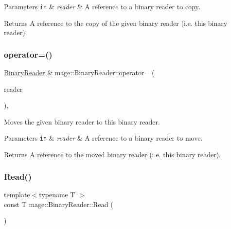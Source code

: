 \begin{DoxyParams}[1]{Parameters}
\mbox{\tt in}  & {\em reader} & A reference to a binary reader to copy. \\
\hline
\end{DoxyParams}
\begin{DoxyReturn}{Returns}
A reference to the copy of the given binary reader (i.\+e. this binary reader). 
\end{DoxyReturn}
\mbox{\label{classmage_1_1_binary_reader_a280998bb89dacdcb88ec87c49ce90a02}} 
\subsubsection{\texorpdfstring{operator=()}{operator=()}\hspace{0.1cm}{\footnotesize\ttfamily [2/2]}}
{\footnotesize\ttfamily \mbox{\hyperlink{classmage_1_1_binary_reader}{Binary\+Reader}} \& mage\+::\+Binary\+Reader\+::operator= (\begin{DoxyParamCaption}\item[{\mbox{\hyperlink{classmage_1_1_binary_reader}{Binary\+Reader}} \&\&}]{reader }\end{DoxyParamCaption})\hspace{0.3cm}{\ttfamily [default]}, {\ttfamily [noexcept]}}

Moves the given binary reader to this binary reader.


\begin{DoxyParams}[1]{Parameters}
\mbox{\tt in}  & {\em reader} & A reference to a binary reader to move. \\
\hline
\end{DoxyParams}
\begin{DoxyReturn}{Returns}
A reference to the moved binary reader (i.\+e. this binary reader). 
\end{DoxyReturn}
\mbox{\label{classmage_1_1_binary_reader_aa99b02137069566c010692093b328a6a}} 
\subsubsection{\texorpdfstring{Read()}{Read()}}
{\footnotesize\ttfamily template$<$typename T $>$ \\
const T mage\+::\+Binary\+Reader\+::\+Read (\begin{DoxyParamCaption}{ }\end{DoxyParamCaption})\hspace{0.3cm}{\ttfamily [protected]}}

